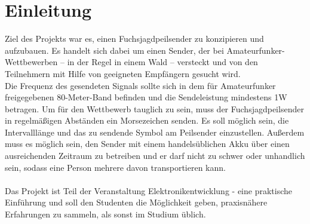 \section{Einleitung}
Ziel des Projekts war es, einen \glqq{}Fuchsjagdpeilsender\grqq{} zu konzipieren und aufzubauen.
Es handelt sich dabei um einen Sender, der bei Amateurfunker-Wettbewerben -- in der Regel in einem
Wald -- versteckt und von den Teilnehmern mit Hilfe von geeigneten Empfängern gesucht wird.\\
Die Frequenz des gesendeten Signals sollte sich in dem für Amateurfunker freigegebenen
80-Meter-Band befinden und die Sendeleistung mindestens 1W betragen. Um für den Wettbewerb
tauglich zu sein, muss der Fuchsjagdpeilsender in regelmäßigen Abständen ein Morsezeichen senden.
Es soll möglich sein, die Intervalllänge und das zu sendende Symbol am Peilsender einzustellen.
Außerdem muss es möglich sein, den Sender mit einem handelsüblichen Akku über einen 
ausreichenden Zeitraum zu betreiben und er darf nicht zu schwer oder unhandlich sein, sodass eine
Person mehrere davon transportieren kann. \\\\
Das Projekt ist Teil der Veranstaltung \glqq{}Elektronikentwicklung - eine praktische 
Einführung\grqq{} und soll den Studenten die Möglichkeit geben, praxisnähere Erfahrungen zu sammeln,
als sonst im Studium üblich.